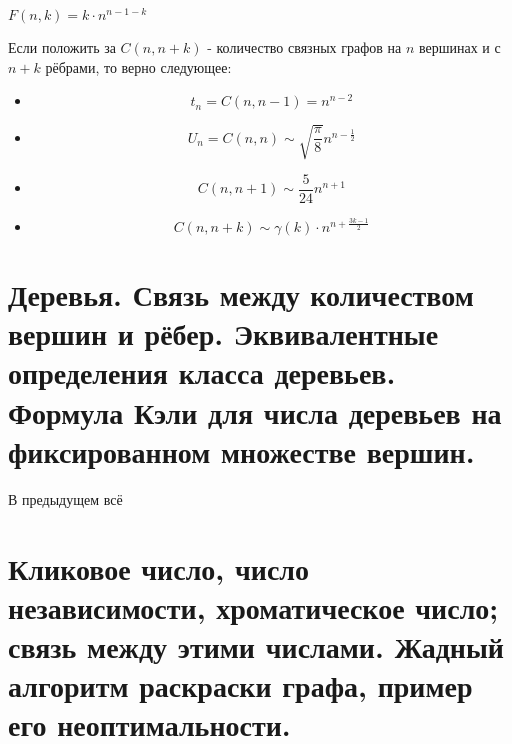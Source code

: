 \begin{multicols}{2}
      \begin{theorema}{}{}
        $F(n, k) = k \cdot n^{n - 1 - k}$
      \end{theorema}
    
    \begin{note}{}{}
      Если положить за $C(n, n + k)$ - количество связных графов на $n$ вершинах и с $n + k$ рёбрами, то верно следующее:
      \begin{itemize}
        \item \[
          t_n = C(n, n - 1) = n^{n - 2}
        \]
        
        \item \[
          U_n = C(n, n) \sim \sqrt{\frac{\pi}{8}} n^{n - \frac{1}{2}}
        \]
        
        \item \[
          C(n, n + 1) \sim \frac{5}{24}n^{n + 1}
        \]
        
        \item \[
          C(n, n + k) \sim \gamma(k) \cdot n^{n + \frac{3k - 1}{2}}
        \]
      \end{itemize}
    \end{note}
    \section{Деревья. Связь между количеством вершин и рёбер. Эквивалентные определения класса
    деревьев. Формула Кэли для числа деревьев на фиксированном множестве вершин.}
В предыдущем всё
    \section{Кликовое число, число независимости, хроматическое число; связь между этими
    числами. Жадный алгоритм раскраски графа, пример его неоптимальности.}
\end{multicols}